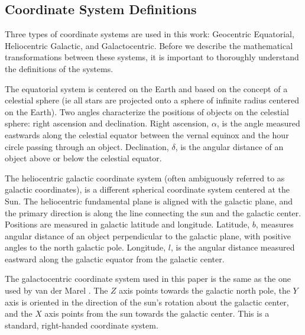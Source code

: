 \documentclass[iop,apj]{emulateapj}
\begin{document}
\subsection{Coordinate System Definitions}
\label{sec:c_sys_defs}
Three types of coordinate systems are used in this work: Geocentric Equatorial, Heliocentric Galactic, and Galactocentric.  Before we describe the mathematical transformations between these systems, it is important to thoroughly understand the definitions of the systems. 
\par The equatorial system is centered on the Earth and based on the concept of a celestial sphere (ie all stars are projected onto a sphere of infinite radius centered on the Earth). Two angles characterize the positions of objects on the celestial sphere: right ascension and declination. Right ascension, $\alpha$, is the angle measured eastwards along the celestial equator between the vernal equinox and the hour circle passing through an object.  Declination, $\delta$, is the angular distance of an object above or below the celestial equator.  
\par The heliocentric galactic coordinate system (often ambiguously referred to as galactic coordinates), is a different spherical coordinate system centered at the Sun.  The heliocentric fundamental plane is aligned with the galactic plane, and the primary direction is along the line connecting the sun and the galactic center.  Positions are measured in galactic latitude and longitude. Latitude, $b$, measures angular distance of an object perpendicular to the galactic plane, with positive angles to the north galactic pole. Longitude, $l$, is the angular distance measured eastward along the galactic equator from the galactic center.
\par The galactocentric coordinate system used in this paper is the same as the one used by van der Marel \citep{VdM08}.  The $Z$ axis points towards the galactic north pole, the $Y$ axis is oriented in the direction of the sun's rotation about the galactic center, and the $X$ axis points from the sun towards the galactic center. This is a standard, right-handed coordinate system.
\end{document}
